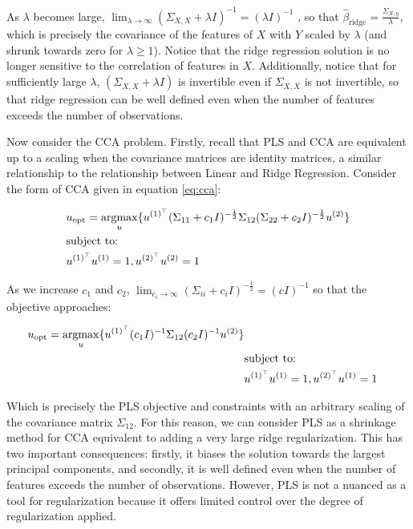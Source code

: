 As $\lambda$ becomes large, $\lim_{\lambda \to \infty} (\Sigma_{X,X} + \lambda I)^{-1} = (\lambda I)^{-1}$
, so that $\hat{\beta}_{\text{ridge}}=\frac{\Sigma_{X,y}}{\lambda}$, which is precisely the covariance of the features of $X$ with $Y$ scaled by $\lambda$ (and shrunk towards zero for $\lambda \geq 1$).
Notice that the ridge regression solution is no longer sensitive to the correlation of features in $X$.
Additionally, notice that for sufficiently large $\lambda$, $(\Sigma_{X,X} + \lambda I)$ is invertible even if $\Sigma_{X,X}$ is not invertible, so that ridge regression can be well defined even when the number of features exceeds the number of observations.

Now consider the CCA problem.
Firstly, recall that PLS and CCA are equivalent up to a scaling when the covariance matrices are identity matrices, a similar relationship to the relationship between Linear and Ridge Regression.
Consider the form of CCA given in equation \ref{eq:cca}:

\begin{align}\label{eq:cca}
     & u_{\text{opt}}=\underset{u}{\mathrm{argmax}}\{ u^{(1)^{\top}}(\Sigma_{11}+ c_1 I)^{-\frac{1}{2}}\Sigma_{12}(\Sigma_{22}+c_2 I)^{-\frac{1}{2}}u^{(2)} \} \\
     & \text{subject to:} \notag \\
     & u^{(1)^{\top}}u^{(1)}=1, u^{(2)^{\top}}u^{(2)}=1 \notag
\end{align}

As we increase $c_1$ and $c_2$, $\lim_{c_i \to \infty} (\Sigma_{ii}+ c_i I)^{-\frac{1}{2}}= (c I)^{-1}$ so that the objective approaches:

\begin{align}\label
     & u_{\text{opt}}=\underset{u}{\mathrm{argmax}}\{ u\spstop{1}(c_1 I)^{-1}\Sigma_{12}(c_2 I)^{-1}u\sps{2} \} \\
        & \text{subject to:} \notag \\
        & u\spstop{1}u\sps{1}=1, u\spstop{2}u\sps{1}=1 \notag
\end{align}

Which is precisely the PLS objective and constraints with an arbitrary scaling of the covariance matrix $\Sigma_{12}$.
For this reason, we can consider PLS as a shrinkage method for CCA equivalent to adding a very large ridge regularization.
This has two important consequences: firstly, it biases the solution towards the largest principal components, and secondly, it is well defined even when the number of features exceeds the number of observations.
However, PLS is not a nuanced as a tool for regularization because it offers limited control over the degree of regularization applied.

